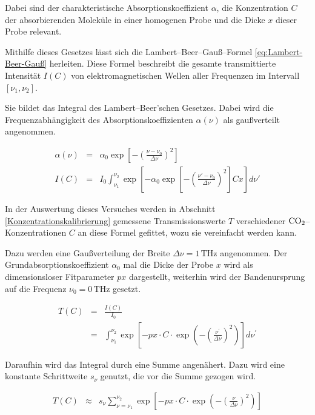\documentclass[12pt,a4paper]{scrartcl}
\numberwithin{equation}{section} %
\begin{document}
	\noindent
	Dabei sind der charakteristische Absorptionskoeffizient $\alpha$, die Konzentration $C$ der absorbierenden Moleküle in einer homogenen Probe und die Dicke $x$ dieser Probe relevant.
	
	Mithilfe dieses Gesetzes lässt sich die Lambert--Beer--Gauß--Formel \eqref{eq:Lambert-Beer-Gauß} herleiten. Diese Formel beschreibt die gesamte transmittierte Intensität $I(C)$ von elektromagnetischen Wellen aller Frequenzen im Intervall $[\nu_1, \nu_2]$.
	
	Sie bildet das Integral des Lambert--Beer'schen Gesetzes. Dabei wird die Frequenzabhängigkeit des Absorptionskoeffizienten $\alpha(\nu)$ als gaußverteilt angenommen.
	
	\begin{eqnarray}
		\alpha(\nu) &=& \alpha_0 \exp[- \left(\frac{\nu - \nu_0}{\Delta \nu}\right)^2] \\
		I(C) &=& I_0 \int_{\nu_1}^{\nu_2} \exp[-\alpha_0 \exp \left[- \left(\frac{\nu' - \nu_0}{\Delta \nu}\right)^2\right] C x] d\nu' \label{eq:Lambert-Beer-Gauß}
	\end{eqnarray}
	
	\noindent
	In der Auswertung dieses Versuches werden in Abschnitt \ref{Konzentrationskalibrierung} gemessene Transmissionswerte $T$ verschiedener $\ce{CO_2}$--Konzentrationen $C$ an diese Formel gefittet, wozu sie vereinfacht werden kann.
	
	Dazu werden eine Gaußverteilung der Breite $\Delta \nu=1\mathrm{\,THz}$ angenommen. Der Grundabsorptionskoeffizient $\alpha_0$ mal die Dicke der Probe $x$ wird als dimensionsloser Fitparameter $px$ dargestellt, weiterhin wird der Bandenursprung auf die Frequenz $\nu_0=0\mathrm{\,THz}$ gesetzt.
	
	\begin{eqnarray}
		T(C) &=& \frac{I(C)}{I_0} \\
		&=& \int_{\nu_1}^{\nu_2} \exp[- px \cdot C \cdot \exp(- \left(\frac{\nu^{\prime}}{\Delta \nu}\right)^2)] d\nu^\prime
	\end{eqnarray}
	
	\noindent
	Daraufhin wird das Integral durch eine Summe angenähert. Dazu wird eine konstante Schrittweite $s_\nu$ genutzt, die vor die Summe gezogen wird.
	
	\begin{eqnarray}
		T(C) &\approx& s_\nu \sum_{\nu = \nu_1}^{\nu_2} \exp[- px \cdot C \cdot \exp(-\left(\frac{\nu}{\Delta \nu}\right)^2)]
		\label{eq:Lambert-Beer-Gauß_vereinfacht}
	\end{eqnarray}
	
\end{document}
